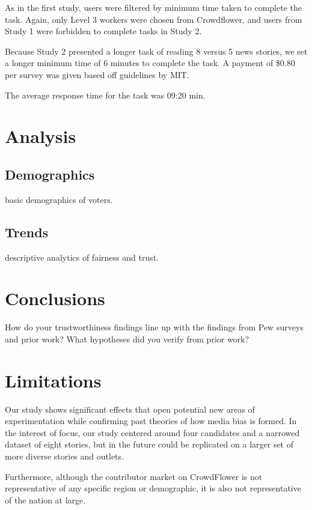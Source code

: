 As in the first study, users were filtered by minimum time taken to complete the task. Again, only Level 3 workers were chosen from Crowdflower, and users from Study 1 were forbidden to complete tasks in Study 2. 

Because Study 2 presented a longer task of reading 8 versus 5 news stories, we set a longer minimum time of 6 minutes to complete the task. A payment of \$0.80 per survey was given based off guidelines by MIT.

The average response time for the task was 09:20 min.

\section{Analysis}


\subsection{Demographics}
basic demographics of voters.

\subsection{Trends}
descriptive analytics of fairness and trust.




 

  


 

\section{Conclusions}

How do your trustworthiness findings line up with the findings from Pew surveys and prior work? What hypotheses did you verify from prior work?

\section{Limitations}

Our study shows significant effects that open potential new areas of experimentation while confirming past theories of how media bias is formed. In the interest of focus, our study centered around four candidates and a narrowed dataset of eight stories, but in the future could be replicated on a larger set of more diverse stories and outlets. 

Furthermore, although the contributor market on CrowdFlower is not representative of any specific region or demographic, it is also not representative of the nation at large.
